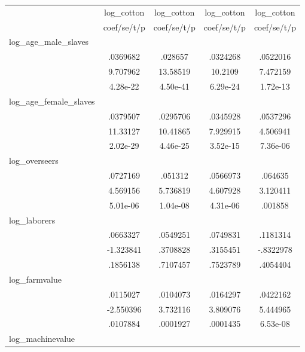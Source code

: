{
\def\sym#1{\ifmmode^{#1}\else\(^{#1}\)\fi}
\begin{tabular}{l*{4}{c}}
\hline\hline
            &\multicolumn{1}{c}{log\_cotton}&\multicolumn{1}{c}{log\_cotton}&\multicolumn{1}{c}{log\_cotton}&\multicolumn{1}{c}{log\_cotton}\\
            & coef/se/t/p& coef/se/t/p& coef/se/t/p& coef/se/t/p\\
\hline
log\_age\_male\_slaves&            &            &            &            \\
            &    .0369682&     .028657&    .0324268&    .0522016\\
            &    9.707962&    13.58519&     10.2109&    7.472159\\
            &    4.28e-22&    4.50e-41&    6.29e-24&    1.72e-13\\
log\_age\_female\_slaves&            &            &            &            \\
            &    .0379507&    .0295706&    .0345928&    .0537296\\
            &    11.33127&    10.41865&    7.929915&    4.506941\\
            &    2.02e-29&    4.46e-25&    3.52e-15&    7.36e-06\\
log\_overseers&            &            &            &            \\
            &    .0727169&     .051312&    .0566973&     .064635\\
            &    4.569156&    5.736819&    4.607928&    3.120411\\
            &    5.01e-06&    1.04e-08&    4.31e-06&     .001858\\
log\_laborers&            &            &            &            \\
            &    .0663327&    .0549251&    .0749831&    .1181314\\
            &   -1.323841&    .3708828&    .3155451&   -.8322978\\
            &    .1856138&    .7107457&    .7523789&    .4054404\\
log\_farmvalue&            &            &            &            \\
            &    .0115027&    .0104073&    .0164297&    .0422162\\
            &   -2.550396&    3.732116&    3.809076&    5.444965\\
            &    .0107884&    .0001927&    .0001435&    6.53e-08\\
log\_machinevalue&            &            &            &            \\

\end{tabular}}
